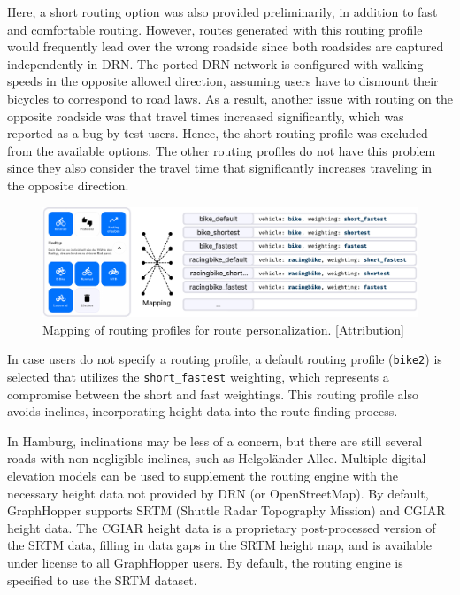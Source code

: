 Here, a short routing option was also provided preliminarily, in addition to fast and comfortable routing. However, routes generated with this routing profile would frequently lead over the wrong roadside since both roadsides are captured independently in DRN. The ported DRN network is configured with walking speeds in the opposite allowed direction, assuming users have to dismount their bicycles to correspond to road laws. As a result, another issue with routing on the opposite roadside was that travel times increased significantly, which was reported as a bug by test users. Hence, the short routing profile was excluded from the available options. The other routing profiles do not have this problem since they also consider the travel time that significantly increases traveling in the opposite direction.

\begin{figure}[t]
\centering
\includegraphics[width=\linewidth]{images/routing-profile-mapping.pdf}
\caption{Mapping of routing profiles for route personalization. [\hyperref[attribution]{Attribution}]}
\label{fig:routing-profile-mapping}
\end{figure}

In case users do not specify a routing profile, a default routing profile (\texttt{bike2}) is selected that utilizes the \texttt{short\_fastest} weighting, which represents a compromise between the short and fast weightings. This routing profile also avoids inclines, incorporating height data into the route-finding process.

In Hamburg, inclinations may be less of a concern, but there are still several roads with non-negligible inclines, such as Helgoländer Allee. Multiple digital elevation models can be used to supplement the routing engine with the necessary height data not provided by DRN (or OpenStreetMap). By default, GraphHopper supports SRTM (Shuttle Radar Topography Mission) \cite{farr_shuttle_2000, farr_shuttle_2007} and CGIAR height data. The CGIAR height data is a proprietary post-processed version of the SRTM data, filling in data gaps in the SRTM height map, and is available under license to all GraphHopper users. By default, the routing engine is specified to use the SRTM dataset.

